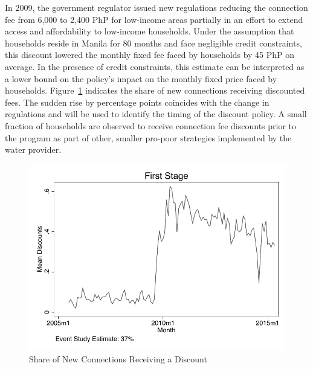\documentclass[12pt]{article}
\begin{document}

In 2009, the government regulator issued new regulations reducing the connection fee from 6,000 to 2,400 PhP for low-income areas partially in an effort to extend access and affordability to low-income households.  Under the assumption that households reside in Manila for 80 months and face negligible credit constraints, this discount lowered the monthly fixed fee faced by households by 45 PhP on average.  In the presence of credit constraints, this estimate can be interpreted as a lower bound on the policy's impact on the monthly fixed price faced by households.  Figure~\ref{figure:discountfirststage} indicates the share of new connections receiving discounted fees.  The sudden rise by percentage points coincides with the change in regulations and will be used to identify the timing of the discount policy.  A small fraction of households are observed to receive connection fee discounts prior to the program as part of other, smaller pro-poor strategies implemented by the water provider.

\begin{figure}
\centering
\caption{Share of New Connections Receiving a Discount}\label{figure:discountfirststage}
\includegraphics[scale=.7]{tables/diff_595_first_stage.pdf}
\end{figure}
\end{document}
